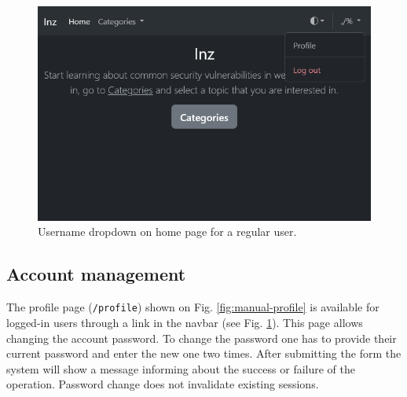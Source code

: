 \begin{figure}
    \centering
    \includegraphics[width=\textwidth]{img/manual-home-dropdown-user.png}
    \caption{Username dropdown on home page for a regular user.}
    \label{fig:manual-home-dropdown-user}
\end{figure}

\subsection{Account management}

The profile page (\texttt{/profile}) shown on Fig. \ref{fig:manual-profile} is available for logged-in users through a link in the navbar (see Fig. \ref{fig:manual-home-dropdown-user}). This page allows changing the account password. To change the password one has to provide their current password and enter the new one two times. After submitting the form the system will show a message informing about the success or failure of the operation. Password change does not invalidate existing sessions.

